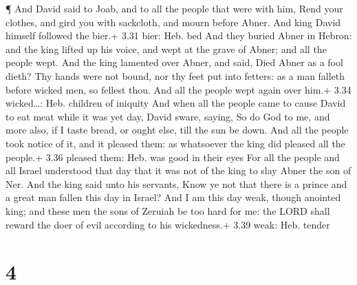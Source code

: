  ¶ And David said to Joab, and to all the people that were
with him, Rend your clothes, and gird you with sackcloth, and mourn
before Abner. And king David himself followed the bier.+ 3.31 bier: Heb.
bed  And they buried Abner in Hebron: and the king lifted
up his voice, and wept at the grave of Abner; and all the people wept.
 And the king lamented over Abner, and said, Died Abner as
a fool dieth?  Thy hands were not bound, nor thy feet put
into fetters: as a man falleth before wicked men, so fellest thou. And
all the people wept again over him.+ 3.34 wicked\ldots: Heb. children of
iniquity  And when all the people came to cause David to
eat meat while it was yet day, David sware, saying, So do God to me, and
more also, if I taste bread, or ought else, till the sun be down.
 And all the people took notice of it, and it pleased them:
as whatsoever the king did pleased all the people.+ 3.36 pleased them:
Heb. was good in their eyes  For all the people and all
Israel understood that day that it was not of the king to slay Abner the
son of Ner.  And the king said unto his servants, Know ye
not that there is a prince and a great man fallen this day in Israel?
 And I am this day weak, though anointed king; and these
men the sons of Zeruiah be too hard for me: the LORD shall reward the
doer of evil according to his wickedness.+ 3.39 weak: Heb. tender

\hypertarget{section-3}{%
\section{4}\label{section-3}}

